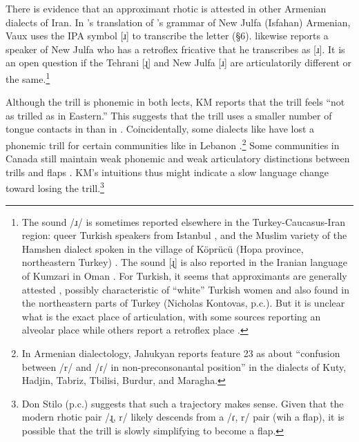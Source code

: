 There is evidence that an approximant rhotic is  attested in   other Armenian dialects of Iran. In \citeauthor{Vaux-prep-NewJulfa}'s translation of  \citet{Adjarian-1940-NewJulfaDialect}'s grammar of New Julfa (Isfahan) Armenian, Vaux uses the IPA symbol [ɹ] to transcribe the letter  (\S 6).  \citet[195]{allen-1950-notesPhoneticsEasternArmenianSpeaker} likewise reports a speaker of New Julfa who has a retroflex fricative that he transcribes as [ɹ].  It is an open question if the Tehrani [ɻ] and New Julfa [ɹ] are articulatorily different or the same.\footnote{The sound /ɹ/ is sometimes reported elsewhere in the Turkey-Caucasus-Iran region:  queer Turkish speakers from Istanbul \citep[11]{Kontovas-2012-LubuncaHistoricaldevelopmentIstanbulQueerSlang},  and the Muslim variety of the Hamshen dialect spoken in the village of Köprücü (Hopa province, northeastern Turkey) \citep[258]{Vaux-2007-HomshetsmaBook}. The sound [ɻ] is also reported in  the Iranian language of Kumzari in Oman \citep[25]{Anonby-2015-GrammarKumzariMixedPersoArabianLanguageOman}. For Turkish, it seems that approximants are generally attested    \citep{Nichols-2016-AcousticStudyTurkishRhotic},  possibly characteristic of ``white'' Turkish women and   also found in the northeastern parts of Turkey  (Nicholas Kontovas, p.c.). But it is unclear what is the exact place of articulation,  with some sources reporting an alveolar place while others report  a retroflex place \citep[12]{Tiras-2021-DissRhoticTurkish}. } 

Although the trill is phonemic in both lects, KM reports that the {\iaIA} trill feels ``not as trilled as in Eastern.'' This suggests that the trill uses a smaller number of tongue contacts in {\iaIA} than in {\seaSE}. Coincidentally, some dialects like {\swaSWA} have lost a phonemic trill for certain communities like in Lebanon \citep[16]{Vaux-1998-ArmenianPhono}.\footnote{In Armenian dialectology, Jahukyan \citep{Jahukyan-1972-ArmenianDiaolectology}     reports feature 23 as about ``confusion between /r/ and /ɾ/ in non-preconsonantal position''  in the dialects of Kuty, Hadjin, Tabriz, Tbilisi, Burdur, and Maragha.} Some communities in Canada still maintain   weak phonemic and weak articulatory distinctions between trills and flaps \citep{Tahtadjian-2020-WesterArmenianRhoticDifferentialPhoneticStudy}. KM's intuitions thus might indicate a slow language change toward  losing the trill.{\footnote{%
	Don Stilo (p.c.) suggests that such a trajectory makes sense. Given that the   modern {\iaAbbre}  rhotic pair /ɻ, r/   likely descends from  a /ɾ, r/ pair (wih a flap), it is possible that the trill is slowly simplifying to become a flap.}}


